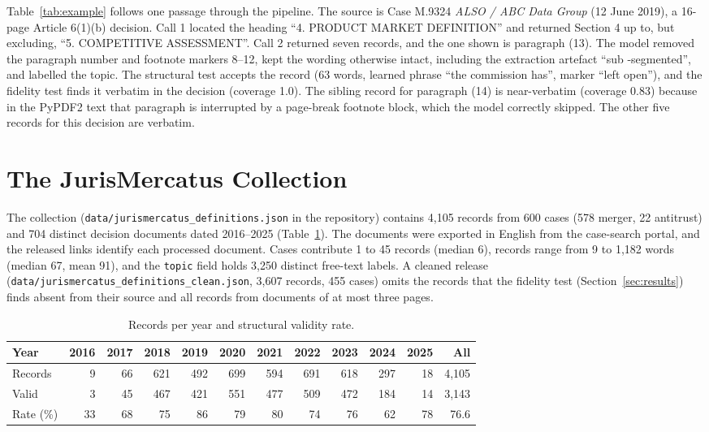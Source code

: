 \documentclass{IOS-Book-Article}
\begin{document}
Table~\ref{tab:example} follows one passage through the pipeline. The source is
Case M.9324 \emph{ALSO / ABC Data Group} (12 June 2019), a 16-page Article
6(1)(b) decision. Call 1 located the heading ``4. PRODUCT MARKET DEFINITION''
and returned Section 4 up to, but excluding, ``5. COMPETITIVE ASSESSMENT''.
Call 2 returned seven records, and the one shown is paragraph (13). The model
removed the paragraph number and footnote markers 8--12, kept the wording
otherwise intact, including the extraction artefact ``sub -segmented'', and
labelled the topic. The structural test accepts the record (63 words, learned
phrase ``the commission has'', marker ``left open''), and the fidelity test
finds it verbatim in the decision (coverage 1.0). The sibling record for
paragraph (14) is near-verbatim (coverage 0.83) because in the PyPDF2 text that
paragraph is interrupted by a page-break footnote block, which the model
correctly skipped. The other five records for this decision are verbatim.

\section{The JurisMercatus Collection}
\label{sec:dataset}

The collection (\texttt{data/jurismercatus\_definitions.json} in the
repository) contains 4,105 records from 600 cases (578 merger, 22 antitrust)
and 704 distinct decision documents dated 2016--2025 (Table~\ref{tab:years}).
The documents were exported in English from the case-search portal, and the
released links identify each processed document. Cases contribute 1 to 45
records (median 6), records range from 9 to 1,182 words (median 67, mean 91),
and the \texttt{topic} field holds 3,250 distinct free-text labels. A cleaned
release (\texttt{data/jurismercatus\_definitions\_clean.json}, 3,607 records,
455 cases) omits the records that the fidelity test (Section~\ref{sec:results})
finds absent from their source and all records from documents of at most three
pages.

\begin{table}[t]
\caption{Records per year and structural validity rate.}
\label{tab:years}
\small
\centering
\setlength{\tabcolsep}{4.5pt}
\begin{tabular}{lrrrrrrrrrrr}
\toprule
Year & 2016 & 2017 & 2018 & 2019 & 2020 & 2021 & 2022 & 2023 & 2024 & 2025 & All\\
\midrule
Records   & 9  & 66 & 621 & 492 & 699 & 594 & 691 & 618 & 297 & 18 & 4,105\\
Valid     & 3  & 45 & 467 & 421 & 551 & 477 & 509 & 472 & 184 & 14 & 3,143\\
Rate (\%) & 33 & 68 & 75  & 86  & 79  & 80  & 74  & 76  & 62  & 78 & 76.6\\
\bottomrule
\end{tabular}
\end{table}
\end{document}
